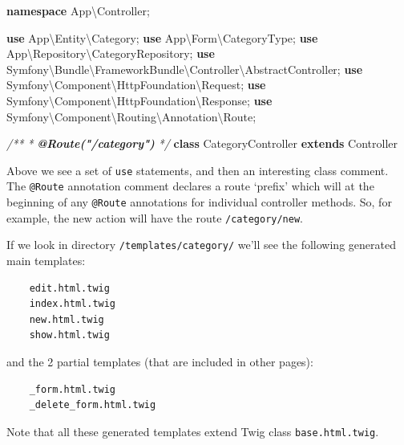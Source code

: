 \documentclass[a4paperpaper,openright]{book}
\newenvironment{Shaded}{}{}
\newcommand{\AnnotationTok}[1]{\textcolor[rgb]{0.38,0.63,0.69}{\textbf{\textit{#1}}}}
\newcommand{\CommentTok}[1]{\textcolor[rgb]{0.38,0.63,0.69}{\textit{#1}}}
\newcommand{\KeywordTok}[1]{\textcolor[rgb]{0.00,0.44,0.13}{\textbf{#1}}}
\newcommand{\NormalTok}[1]{#1}
\newcommand{\OtherTok}[1]{\textcolor[rgb]{0.00,0.44,0.13}{#1}}
\begin{document}
\begin{Shaded}
\begin{Highlighting}[]
    \KeywordTok{namespace}\NormalTok{ App\textbackslash{}Controller}\OtherTok{;}

    \KeywordTok{use}\NormalTok{ App\textbackslash{}Entity\textbackslash{}Category}\OtherTok{;}
    \KeywordTok{use}\NormalTok{ App\textbackslash{}Form\textbackslash{}CategoryType}\OtherTok{;}
    \KeywordTok{use}\NormalTok{ App\textbackslash{}Repository\textbackslash{}CategoryRepository}\OtherTok{;}
    \KeywordTok{use}\NormalTok{ Symfony\textbackslash{}Bundle\textbackslash{}FrameworkBundle\textbackslash{}Controller\textbackslash{}AbstractController}\OtherTok{;}
    \KeywordTok{use}\NormalTok{ Symfony\textbackslash{}Component\textbackslash{}HttpFoundation\textbackslash{}Request}\OtherTok{;}
    \KeywordTok{use}\NormalTok{ Symfony\textbackslash{}Component\textbackslash{}HttpFoundation\textbackslash{}Response}\OtherTok{;}
    \KeywordTok{use}\NormalTok{ Symfony\textbackslash{}Component\textbackslash{}Routing\textbackslash{}Annotation\textbackslash{}Route}\OtherTok{;}

    \CommentTok{/**}
\CommentTok{     * }\AnnotationTok{@Route("/category")}
\CommentTok{     */}
    \KeywordTok{class}\NormalTok{ CategoryController }\KeywordTok{extends}\NormalTok{ Controller}
\end{Highlighting}
\end{Shaded}

Above we see a set of \texttt{use} statements, and then an interesting
class comment. The \texttt{@Route} annotation comment declares a route
`prefix' which will at the beginning of any \texttt{@Route} annotations
for individual controller methods. So, for example, the new action will
have the route \texttt{/category/new}.

If we look in directory \texttt{/templates/category/} we'll see the
following generated main templates:

\begin{verbatim}
    edit.html.twig
    index.html.twig
    new.html.twig
    show.html.twig
\end{verbatim}

and the 2 partial templates (that are included in other pages):

\begin{verbatim}
    _form.html.twig
    _delete_form.html.twig
\end{verbatim}

Note that all these generated templates extend Twig class
\texttt{base.html.twig}.
\end{document}
